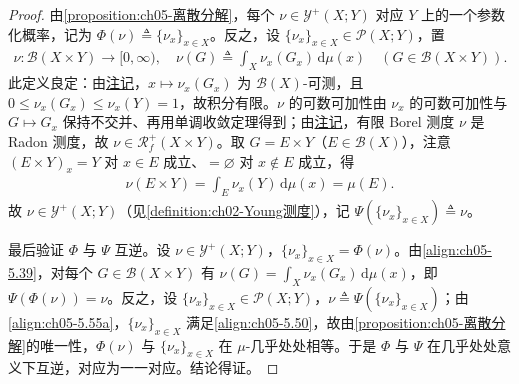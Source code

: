 \documentclass[../../main.tex]{subfiles}%
\begin{document}
\begin{proof}
由\cref{proposition:ch05-离散分解}，每个 $\nu\in\mathcal{Y}^+(X;Y)$ 对应 $Y$ 上的一个参数化概率，记为 $\Phi(\nu)\triangleq\{\nu_x\}_{x\in X}$。反之，设 $\{\nu_x\}_{x\in X}\in\mathcal{P}(X;Y)$，置
\begin{align}
\nu:\mathscr{B}(X\times Y)\to[0,\infty),\quad
\nu(G)\triangleq \int_X\nu_x(G_x)\,\mathrm{d}\mu(x)
\quad(G\in\mathscr{B}(X\times Y)).\label{align:ch05-5.55a}
\end{align}
此定义良定：由\hyperref[remark:ch05-参数测度等价]{注记}，$x\mapsto\nu_x(G_x)$ 为 $\mathscr{B}(X)$-可测，且 $0\leqslant\nu_x(G_x)\leqslant\nu_x(Y)=1$，故积分有限。$\nu$ 的可数可加性由 $\nu_x$ 的可数可加性与 $G\mapsto G_x$ 保持不交并、再用单调收敛定理得到；由\hyperref[remark:ch01-BorelRadon一致]{注记}，有限 Borel 测度 $\nu$ 是 Radon 测度，故 $\nu\in\mathscr{R}^+_f(X\times Y)$。取 $G=E\times Y$（$E\in\mathscr{B}(X)$），注意 $(E\times Y)_x=Y$ 对 $x\in E$ 成立、$=\varnothing$ 对 $x\notin E$ 成立，得
\begin{align*}
\nu(E\times Y)=\int_E\nu_x(Y)\,\mathrm{d}\mu(x)=\mu(E).
\end{align*}
故 $\nu\in\mathcal{Y}^+(X;Y)$（见\cref{definition:ch02-Young测度}），记 $\Psi(\{\nu_x\}_{x\in X})\triangleq\nu$。

最后验证 $\Phi$ 与 $\Psi$ 互逆。设 $\nu\in\mathcal{Y}^+(X;Y)$，$\{\nu_x\}_{x\in X}=\Phi(\nu)$。由\eqref{align:ch05-5.39}，对每个 $G\in\mathscr{B}(X\times Y)$ 有 $\nu(G)=\int_X\nu_x(G_x)\,\mathrm{d}\mu(x)$，即 $\Psi(\Phi(\nu))=\nu$。反之，设 $\{\nu_x\}_{x\in X}\in\mathcal{P}(X;Y)$，$\nu\triangleq\Psi(\{\nu_x\}_{x\in X})$；由\eqref{align:ch05-5.55a}，$\{\nu_x\}_{x\in X}$ 满足\eqref{align:ch05-5.50}，故由\cref{proposition:ch05-离散分解}的唯一性，$\Phi(\nu)$ 与 $\{\nu_x\}_{x\in X}$ 在 $\mu$-几乎处处相等。于是 $\Phi$ 与 $\Psi$ 在几乎处处意义下互逆，对应为一一对应。结论得证。
\end{proof}
\end{document}
